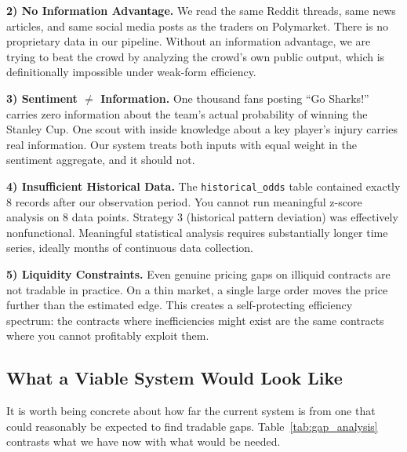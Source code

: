 \documentclass[conference]{IEEEtran}
\begin{document}
\textbf{2) No Information Advantage.} We read the same Reddit threads, same news articles, and same social media posts as the traders on Polymarket. There is no proprietary data in our pipeline. Without an information advantage, we are trying to beat the crowd by analyzing the crowd's own public output, which is definitionally impossible under weak-form efficiency.

\textbf{3) Sentiment $\neq$ Information.} One thousand fans posting ``Go Sharks!'' carries zero information about the team's actual probability of winning the Stanley Cup. One scout with inside knowledge about a key player's injury carries real information. Our system treats both inputs with equal weight in the sentiment aggregate, and it should not.

\textbf{4) Insufficient Historical Data.} The \texttt{historical\_odds} table contained exactly 8 records after our observation period. You cannot run meaningful z-score analysis on 8 data points. Strategy 3 (historical pattern deviation) was effectively nonfunctional. Meaningful statistical analysis requires substantially longer time series, ideally months of continuous data collection.

\textbf{5) Liquidity Constraints.} Even genuine pricing gaps on illiquid contracts are not tradable in practice. On a thin market, a single large order moves the price further than the estimated edge. This creates a self-protecting efficiency spectrum: the contracts where inefficiencies might exist are the same contracts where you cannot profitably exploit them.

\subsection{What a Viable System Would Look Like}

It is worth being concrete about how far the current system is from one that could reasonably be expected to find tradable gaps. Table~\ref{tab:gap_analysis} contrasts what we have now with what would be needed.
\end{document}
